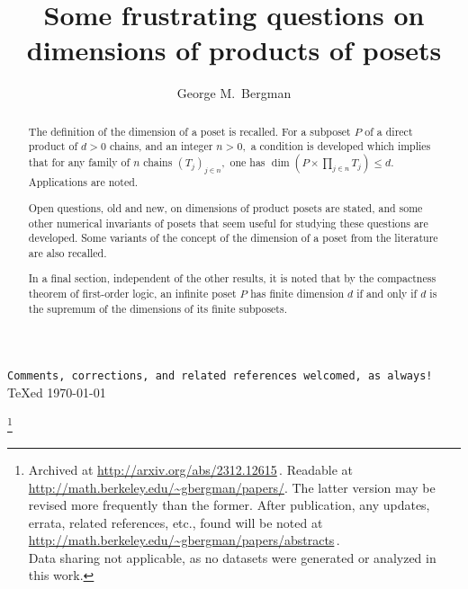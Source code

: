 \documentclass{amsart}
\numberwithin{equation}{section}
\numberwithin{theorem}{section}
\newcommand{\2}{\mathbf{2}}
\begin{document}
\begin{center}
\texttt{Comments, corrections,
and related references welcomed, as always!}\\[.5em]
{\TeX}ed \today
\\[.5em]
\vspace{2em}
\end{center}

\title%
[Dimensions of products of posets]%
{Some frustrating questions on \\
dimensions of products of posets}
\thanks{%
Archived at \url{http://arxiv.org/abs/2312.12615}\,.
Readable at \url{http://math.berkeley.edu/~gbergman/papers/}.
The latter version may be revised more frequently than the former.
After publication, any updates, errata, related references,
etc., found will be noted at
\url{http://math.berkeley.edu/~gbergman/papers/abstracts}\,.\\
\hspace*{1.5em}Data sharing not applicable, as no datasets were
generated or analyzed in this work.
}


\author{George M.\ Bergman}
\address{Department of Mathematics\\
University of California\\
Berkeley, CA 94720-3840, USA}

\begin{abstract}
The definition of the dimension of a poset is recalled.
For a subposet $P$ of a direct product of $d>0$ chains,
and an integer $n>0,$ a condition is developed which
implies that for any
family of $n$ chains $(T_j)_{j\in n},$ one has
\mbox{$\dim(P\times\prod_{j\in n}T_j)\leq d.$}
Applications are noted.

Open questions, old and new, on dimensions of product posets
are stated, and some other numerical invariants of posets that seem
useful for studying these questions are developed.
Some variants of the concept of the dimension of
a poset from the literature are also recalled.

In a final section, independent of the other results, it is
noted that by the compactness theorem of first-order logic,
an infinite poset $P$ has finite dimension $d$ if and only if $d$
is the supremum of the dimensions of its finite subposets.
\end{abstract}
\maketitle
\end{document}
